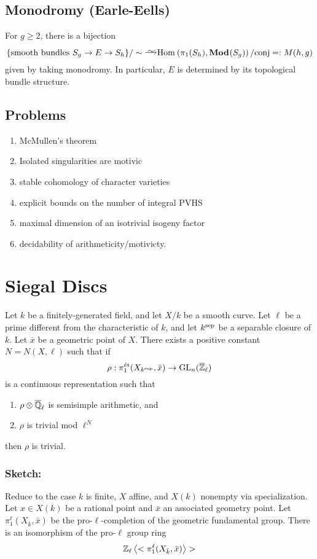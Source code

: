 \documentclass[12pt]{article}
\begin{document}
\subsection{Monodromy (Earle-Eells)}

For $g \ge 2$, there is a bijection
\[ \{\text{smooth bundles } S_g \to E \to S_h \} / \sim \iso \Hom{}{\pi_1(S_h)}{\Mod{}(S_g)}/ \text{conj} =: M(h,g) \]
given by taking monodromy. In particular, $E$ is determined by its topological bundle structure. 

\subsection{Problems}

\begin{enumerate}
\item McMullen's theorem
\item Isolated singularities are motivic
\item stable cohomology of character varieties
\item explicit bounds on the number of integral PVHS
\item maximal dimension of an isotrivial isogeny factor
\item decidability of arithmeticity/motivicty.
\end{enumerate}

\section{Siegal Discs}

\begin{theorem}
Let $k$ be a finitely-generated field, and let $X / k$ be a smooth curve. Let $\ell$ be a prime different from the characteristic of $k$, and let $k^{\mathrm{sep}}$ be a separable closure of $k$. Let $\bar{x}$ be a geometric point of $X$. There exists a positive constant $N = N(X, \ell)$ such that if
\[ \rho : \pi_1^{\text{\'{e}t}}(X_{k^{\mathrm{sep}}}, \bar{x}) \to \mathrm{GL}_n(\overline{\mathbb{Z}}_{\ell}) \]
is a continuous representation such that
\begin{enumerate}
\item $\rho \otimes \overline{\mathbb{Q}}_{\ell}$ is semisimple arithmetic, and
\item $\rho$ is trivial mod $\ell^N$
\end{enumerate}
then $\rho$ is trivial. 
\end{theorem}


\subsubsection{Sketch:}

Reduce to the case $k$ is finite, $X$ affine, and $X(k)$ nonempty via specialization. Let $x \in X(k)$ be a rational point and $\bar{x}$ an associated geometry point. Let $\pi_1^{\ell}(X_{\bar{k}}, \bar{x})$ be the pro-$\ell$-completion of the geometric \etale fundamental group. There is an isomorphism of the pro-$\ell$ group ring
\[ \mathbb{Z}_{\ell} \left<< \pi_1^{\ell}(X_{\bar{k}}, \bar{x})\right>> \]
\end{document}
